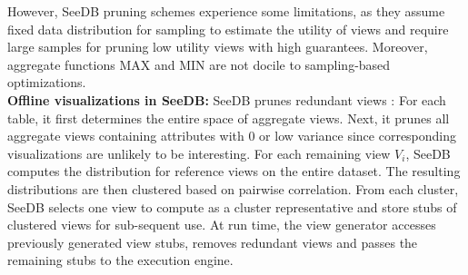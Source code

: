  However, SeeDB pruning schemes experience some limitations, as they assume 
  fixed data distribution  \cite{DBLP:journals/pvldb/VartakMPP14,vartakseedb}  for sampling to estimate
  the utility of views and require large samples for pruning low utility views with high guarantees.
  Moreover, aggregate functions MAX and MIN are not docile to sampling-based 
  optimizations. \\
	
\noindent \textbf {Offline visualizations in SeeDB: }
SeeDB prunes redundant views \cite {DBLP:journals/pvldb/VartakMPP14} : For each table, it first determines 
the entire space of aggregate views. Next, it prunes all 
aggregate views containing attributes with $0$ or low variance since corresponding 
visualizations are unlikely to be interesting. For each remaining view $V_i$, SeeDB computes
 the distribution for reference views on the entire dataset. 
 The resulting distributions are then clustered based on pairwise correlation. 
 From each cluster, SeeDB selects one view to compute as a cluster representative and 
 store stubs of clustered views for sub-sequent use. At run time, the view generator accesses 
 previously generated view stubs, removes redundant views and passes the remaining stubs 
 to the execution engine. 

